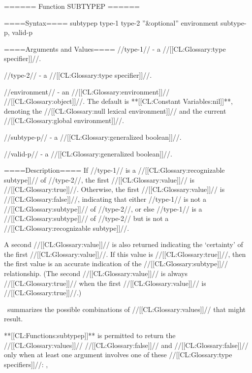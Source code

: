 ====== Function SUBTYPEP ======

====Syntax====
\DefunWithValues subtypep {type-1 type-2 ''&optional'' environment} {subtype-p, valid-p}

====Arguments and Values====
//type-1// - a //[[CL:Glossary:type specifier]]//.

//type-2// - a //[[CL:Glossary:type specifier]]//.

//environment// - an //[[CL:Glossary:environment]]// //[[CL:Glossary:object]]//. The default is **[[CL:Constant Variables:nil]]**, denoting the //[[CL:Glossary:null lexical environment]]// and the current //[[CL:Glossary:global environment]]//.

//subtype-p// - a //[[CL:Glossary:generalized boolean]]//.

//valid-p// - a //[[CL:Glossary:generalized boolean]]//.

====Description====
If //type-1// is a //[[CL:Glossary:recognizable subtype]]// of //type-2//, the first //[[CL:Glossary:value]]// is //[[CL:Glossary:true]]//. Otherwise, the first //[[CL:Glossary:value]]// is //[[CL:Glossary:false]]//, indicating that either //type-1// is not a //[[CL:Glossary:subtype]]// of //type-2//, or else //type-1// is a //[[CL:Glossary:subtype]]// of //type-2// but is not a //[[CL:Glossary:recognizable subtype]]//.

A second //[[CL:Glossary:value]]// is also returned indicating the `certainty' of the first //[[CL:Glossary:value]]//. If this value is //[[CL:Glossary:true]]//, then the first value is an accurate indication of the //[[CL:Glossary:subtype]]// relationship. (The second //[[CL:Glossary:value]]// is always //[[CL:Glossary:true]]// when the first //[[CL:Glossary:value]]// is //[[CL:Glossary:true]]//.)

\Thenextfigure\ summarizes the possible combinations of //[[CL:Glossary:values]]// that might result.


**[[CL:Functions:subtypep]]** is permitted to return the //[[CL:Glossary:values]]// //[[CL:Glossary:false]]// and //[[CL:Glossary:false]]// only when at least one argument involves one of these //[[CL:Glossary:type specifiers]]//: ,

